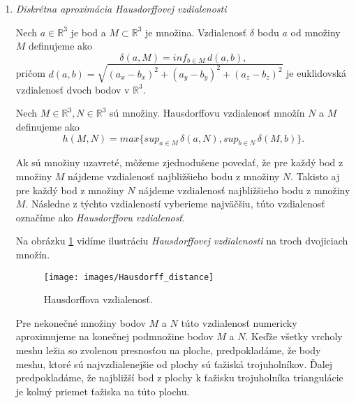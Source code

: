 \begin{enumerate}
{    Odmeriame priemerný pomer najväčšej a najmenšej strany a budeme sledovať, či sa pri 
    zmenšujúcej dĺžke $a$ zmenšuje, resp. blíži zhora k $1$.

    Kritérium budeme označovať $k_3$.
}
\item{
    \textit{Diskrétna aproximácia Hausdorffovej vzdialenosti}

    \begin{definition}
        Nech $a \in \mathbb{R}^3$ je bod a $M \subset \mathbb{R}^3$ je množina.
        Vzdialenosť $\delta$ bodu $a$ od množiny $M$ definujeme ako
        \begin{equation}
            \delta(a, M) = inf_{b \in M} \, d(a, b),
        \end{equation}
        pričom $d(a, b) = \sqrt{(a_x-b_x)^2 + (a_y-b_y)^2 + (a_z-b_z)^2}$ je euklidovská 
        vzdialenosť dvoch bodov v $\mathbb{R}^3$.
    \end{definition}

    \begin{definition}
        Nech $M \in \mathbb{R}^3, N \in \mathbb{R}^3$ sú množiny.
        Hausdorffovu vzdialenosť množín $N$ a $M$ definujeme ako
        \begin{equation}
            h(M, N) = max \big \{sup_{a \in M} \, \delta(a, N), sup_{b \in N} \, \delta(M, b) \big \}.
        \end{equation}
    \end{definition}

    Ak sú množiny uzavreté, môžeme zjednodušene povedať, že pre každý bod z množiny $M$ nájdeme 
    vzdialenosť najbližšieho bodu z množiny $N$.
    Takisto aj pre každý bod z množiny $N$ nájdeme vzdialenosť najbližšieho bodu z množiny $M$.
    Následne z týchto vzdialeností vyberieme najväčšiu, túto vzdialenosť označíme ako 
    \textit{Hausdorffovu vzdialenosť}.

    Na obrázku \ref{obr:hausdorff_distance} vidíme ilustráciu \textit{Hausdorffovej vzdialenosti} 
    na troch dvojiciach množín.

    \begin{figure}
        \centerline{\texttt{[image: images/Hausdorff\_distance]}}
        \caption[Hausdorffova vzdialenosť]{Hausdorffova vzdialenosť.}
        \label{obr:hausdorff_distance}
    \end{figure}


    Pre nekonečné množiny bodov $M$ a $N$ túto vzdialenosť numericky aproximujeme na konečnej 
    podmnožine bodov $M$ a $N$. Keďže všetky vrcholy meshu ležia so zvolenou presnosťou na ploche, 
    predpokladáme, že body meshu, ktoré sú najvzdialenejšie od plochy sú ťažiská trojuholníkov.
    Ďalej predpokladáme, že najbližší bod z plochy k ťažisku trojuholníka triangulácie
    je kolmý priemet ťažiska na túto plochu.

}
\end{enumerate}
